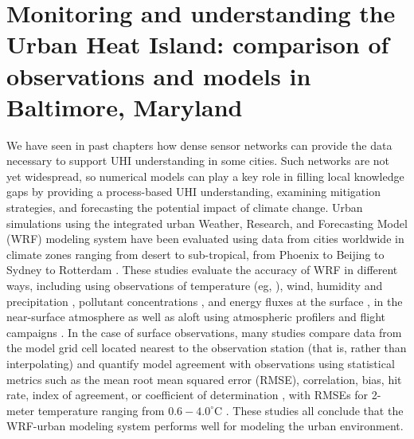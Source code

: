 \chapter{Monitoring and understanding the Urban Heat Island: comparison of observations and models in Baltimore, Maryland}
\label{chap:bmore2}

We have seen in past chapters how dense sensor networks can provide the data necessary to support UHI understanding in some cities. Such networks are not yet widespread, so %
numerical models can play a key role in filling local knowledge gaps by providing a process-based UHI understanding, examining mitigation strategies, and forecasting the potential impact of climate change. 
Urban simulations using the integrated urban Weather, Research, and Forecasting Model (WRF) modeling system \citep{chen2011integrated} have been evaluated using data from cities worldwide in climate zones ranging from desert to sub-tropical, from Phoenix \citep{georgescu2013summer} to Beijing \citep{wang2013modeling} to Sydney \citep{argueso2014temperature} to Rotterdam \citep{theeuwes2014seasonal}. 
These studies evaluate the accuracy of WRF in different ways,
including using observations of temperature (eg, \citet{kusaka2012numerical}), wind, humidity and precipitation \citep{miao2011impacts,chen2011numerical}, pollutant concentrations \citep{brioude2013top}, and energy fluxes at the surface \citep{yang2015enhancing,loridan2012multi}, in the near-surface atmosphere as well as aloft using atmospheric profilers and flight campaigns \citep{li2013development}. 
In the case of surface observations, many studies compare data from the model grid cell located nearest to the observation station (that is, rather than interpolating) and quantify model agreement with observations using statistical metrics such as the mean root mean squared error (RMSE), correlation, bias, hit rate, index of agreement, or coefficient of determination \citep{loridan2010trade,salamanca2011study,lee2011evaluation,chen2011numerical,chen2014wrf,li2013multi}, with RMSEs for 2-meter temperature ranging from $0.6-4.0^\circ$C \citep{kim2013evaluation}. These studies 
all conclude that the WRF-urban modeling system performs well for modeling the urban environment. %

